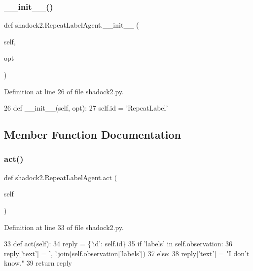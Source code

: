 \subsubsection{\texorpdfstring{\+\_\+\+\_\+init\+\_\+\+\_\+()}{\_\_init\_\_()}}
{\footnotesize\ttfamily def shadock2.\+Repeat\+Label\+Agent.\+\_\+\+\_\+init\+\_\+\+\_\+ (\begin{DoxyParamCaption}\item[{}]{self,  }\item[{}]{opt }\end{DoxyParamCaption})}



Definition at line 26 of file shadock2.\+py.


\begin{DoxyCode}
26     \textcolor{keyword}{def }\_\_init\_\_(self, opt):
27         self.id = \textcolor{stringliteral}{'RepeatLabel'}
\end{DoxyCode}


\subsection{Member Function Documentation}
\mbox{\label{classshadock2_1_1RepeatLabelAgent_a92d93b9cce5feb83096369a7d567624c}} 
\subsubsection{\texorpdfstring{act()}{act()}}
{\footnotesize\ttfamily def shadock2.\+Repeat\+Label\+Agent.\+act (\begin{DoxyParamCaption}\item[{}]{self }\end{DoxyParamCaption})}



Definition at line 33 of file shadock2.\+py.


\begin{DoxyCode}
33     \textcolor{keyword}{def }act(self):
34         reply = \{\textcolor{stringliteral}{'id'}: self.id\}
35         \textcolor{keywordflow}{if} \textcolor{stringliteral}{'labels'} \textcolor{keywordflow}{in} self.observation:
36             reply[\textcolor{stringliteral}{'text'}] = \textcolor{stringliteral}{', '}.join(self.observation[\textcolor{stringliteral}{'labels'}])
37         \textcolor{keywordflow}{else}:
38             reply[\textcolor{stringliteral}{'text'}] = \textcolor{stringliteral}{"I don't know."}
39         \textcolor{keywordflow}{return} reply
\end{DoxyCode}
\mbox{\label{classshadock2_1_1RepeatLabelAgent_ade5633ad82b7dc87c7bb51bacb2591e5}} 
